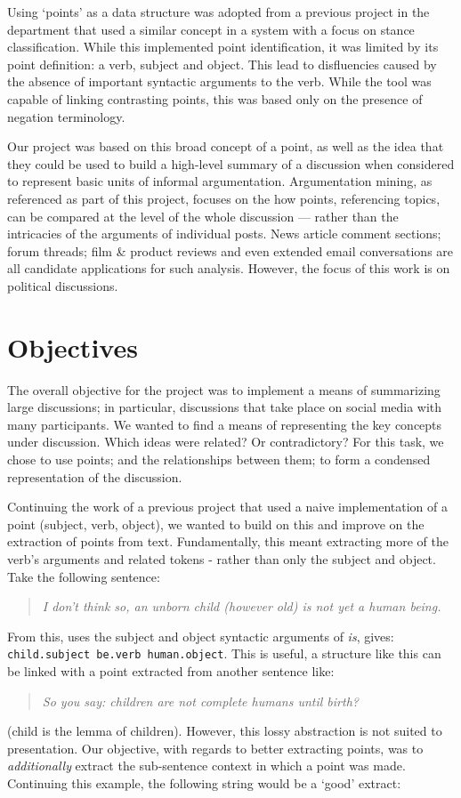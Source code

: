     Using `points' as a data structure was adopted from a previous project in the department that used a similar concept in a system with a focus on stance classification. While this implemented point identification, it was limited by its point definition: a verb, subject and object. This lead to disfluencies caused by the absence of important syntactic arguments to the verb. While the tool was capable of linking contrasting points, this was based only on the presence of negation terminology.

    Our project was based on this broad concept of a point, as well as the idea that they could be used to build a high-level summary of a discussion when considered to represent basic units of informal argumentation. Argumentation mining, as referenced as part of this project, focuses on the how points, referencing topics, can be compared at the level of the whole discussion --- rather than the intricacies of the arguments of individual posts. News article comment sections; forum threads; film \& product reviews and even extended email conversations are all candidate applications for such analysis. However, the focus of this work is on political discussions.

  \section{Objectives}
    The overall objective for the project was to implement a means of summarizing large discussions; in particular, discussions that take place on social media with many participants. We wanted to find a means of representing the key concepts under discussion. Which ideas were related? Or contradictory? For this task, we chose to use points; and the relationships between them; to form a condensed representation of the discussion.

    Continuing the work of a previous project that used a naive implementation of a point (subject, verb, object), we wanted to build on this and improve on the extraction of points from text. Fundamentally, this meant extracting more of the verb's arguments and related tokens - rather than only the subject and object. Take the following sentence:

    \medskip
    \begin{center}
    \blockquote{\textit{I don't think so, an unborn child (however old) is not yet a human being.}}
    \end{center}
    \medskip

    From this, uses the subject and object syntactic arguments of \textit{is}, gives: \texttt{child.subject be.verb human.object}. This is useful, a structure like this can be linked with a point extracted from another sentence like: \blockquote{\textit{So you say: children are not complete humans until birth?}} (child is the lemma of children). However, this lossy abstraction is not suited to presentation. Our objective, with regards to better extracting points, was to \textit{additionally} extract the sub-sentence context in which a point was made. Continuing this example, the following string would be a `good' extract:

